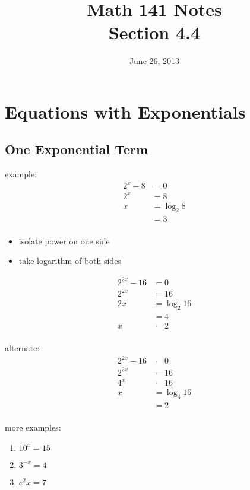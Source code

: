 \documentclass{exam}
\title{Math 141 Notes \\ Section 4.4}
\date{June 26, 2013}
\begin{document}
  \maketitle
  \tableofcontents

  \section{Equations with Exponentials}

  \subsection{One Exponential Term}
  example:
  \begin{align*}
    2^x - 8 &= 0 \\
    2^x     &= 8 \\
    x       &= \log_2 8 \\
            &= 3 \\
  \end{align*}

  \begin{itemize}
    \item isolate power on one side
    \item take logarithm of both sides 
  \end{itemize}

  \begin{align*}
    2^{2x} - 16 &= 0 \\
    2^{2x}      &= 16 \\
    2x          &= \log_2 16 \\
                &= 4 \\
    x           &= 2 \\
  \end{align*}

  alternate:
  \begin{align*}
    2^{2x} - 16 &= 0 \\
    2^{2x} &= 16 \\
    4^x &= 16 \\
    x       &= \log_4 16 \\
            &= 2 \\
  \end{align*}

  more examples:
  \begin{enumerate}
    \item $10^x = 15$

    \item $3^{-x} = 4$

    \item $e^2x = 7$

  \end{enumerate}
\end{document}
